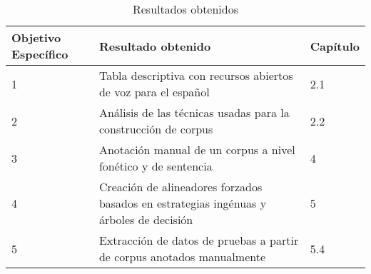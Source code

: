 \begin{table}[H]
\centering
\caption{Resultados obtenidos}
\label{tab:resultados_obtenidos}
\begin{tabular}{|l|l|l|}
\hline
\multicolumn{1}{|p{2.3cm}|}{\textbf{Objetivo Específico}}  & \textbf{Resultado obtenido}  & \textbf{Capítulo}\\
\hline
1 & Tabla descriptiva con recursos abiertos de voz para el español & 2.1 \\
\hline
2 & Análisis de las técnicas usadas para la construcción de corpus & 2.2 \\
\hline
3 & Anotación manual de un corpus a nivel fonético y de sentencia & 4 \\
\hline
4 & Creación de alineadores forzados basados en estrategias ingénuas y árboles de decisión & 5 \\
\hline
5 & Extracción de datos de pruebas a partir de corpus anotados manualmente & 5.4 \\
\hline
\end{tabular}
\end{table}